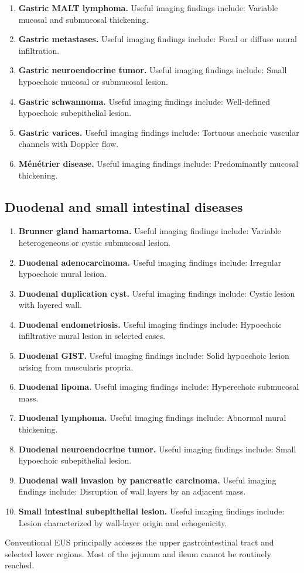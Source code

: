 \begin{enumerate}[leftmargin=*,itemsep=0.45em,topsep=0.4em]
\item \textbf{Gastric MALT lymphoma.} Useful imaging findings include: Variable mucosal and submucosal thickening.
\item \textbf{Gastric metastases.} Useful imaging findings include: Focal or diffuse mural infiltration.
\item \textbf{Gastric neuroendocrine tumor.} Useful imaging findings include: Small hypoechoic mucosal or submucosal lesion.
\item \textbf{Gastric schwannoma.} Useful imaging findings include: Well-defined hypoechoic subepithelial lesion.
\item \textbf{Gastric varices.} Useful imaging findings include: Tortuous anechoic vascular channels with Doppler flow.
\item \textbf{M\'en\'etrier disease.} Useful imaging findings include: Predominantly mucosal thickening.
\end{enumerate}

\subsection{Duodenal and small intestinal diseases}
\begin{enumerate}[leftmargin=*,itemsep=0.45em,topsep=0.4em]
\item \textbf{Brunner gland hamartoma.} Useful imaging findings include: Variable heterogeneous or cystic submucosal lesion.
\item \textbf{Duodenal adenocarcinoma.} Useful imaging findings include: Irregular hypoechoic mural lesion.
\item \textbf{Duodenal duplication cyst.} Useful imaging findings include: Cystic lesion with layered wall.
\item \textbf{Duodenal endometriosis.} Useful imaging findings include: Hypoechoic infiltrative mural lesion in selected cases.
\item \textbf{Duodenal GIST.} Useful imaging findings include: Solid hypoechoic lesion arising from muscularis propria.
\item \textbf{Duodenal lipoma.} Useful imaging findings include: Hyperechoic submucosal mass.
\item \textbf{Duodenal lymphoma.} Useful imaging findings include: Abnormal mural thickening.
\item \textbf{Duodenal neuroendocrine tumor.} Useful imaging findings include: Small hypoechoic subepithelial lesion.
\item \textbf{Duodenal wall invasion by pancreatic carcinoma.} Useful imaging findings include: Disruption of wall layers by an adjacent mass.
\item \textbf{Small intestinal subepithelial lesion.} Useful imaging findings include: Lesion characterized by wall-layer origin and echogenicity.
\end{enumerate}
Conventional EUS principally accesses the upper gastrointestinal tract and selected lower regions. Most of the jejunum and ileum cannot be routinely reached.

